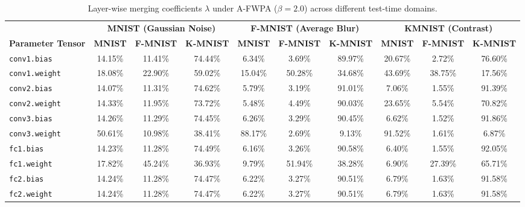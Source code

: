 \documentclass{article}
\theoremstyle{plain}
\theoremstyle{definition}
\theoremstyle{remark}
\begin{document}
\begin{table}[h]
\centering
\caption{Layer-wise merging coefficients $\lambda$ under A-FWPA ($\beta = 2.0$) across different test-time domains.}
\label{tab:layer_dynamics_specs}
\vskip 0.1in
\scriptsize
\setlength{\tabcolsep}{4pt}
\begin{tabular}{lccccccccc}
\toprule
 & \multicolumn{3}{c}{\textbf{MNIST (Gaussian Noise)}} & \multicolumn{3}{c}{\textbf{F-MNIST (Average Blur)}} & \multicolumn{3}{c}{\textbf{KMNIST (Contrast)}} \\
\cmidrule(r){2-4} \cmidrule(r){5-7} \cmidrule(r){8-10}
\textbf{Parameter Tensor} & \textbf{MNIST} & \textbf{F-MNIST} & \textbf{K-MNIST} & \textbf{MNIST} & \textbf{F-MNIST} & \textbf{K-MNIST} & \textbf{MNIST} & \textbf{F-MNIST} & \textbf{K-MNIST} \\
\midrule
\texttt{conv1.bias} & 14.15\% & 11.41\% & 74.44\% & 6.34\% & 3.69\% & 89.97\% & 20.67\% & 2.72\% & 76.60\% \\
\texttt{conv1.weight} & 18.08\% & 22.90\% & 59.02\% & 15.04\% & 50.28\% & 34.68\% & 43.69\% & 38.75\% & 17.56\% \\
\texttt{conv2.bias} & 14.07\% & 11.31\% & 74.62\% & 5.79\% & 3.19\% & 91.01\% & 7.06\% & 1.55\% & 91.39\% \\
\texttt{conv2.weight} & 14.33\% & 11.95\% & 73.72\% & 5.48\% & 4.49\% & 90.03\% & 23.65\% & 5.54\% & 70.82\% \\
\texttt{conv3.bias} & 14.26\% & 11.29\% & 74.45\% & 6.26\% & 3.29\% & 90.45\% & 6.62\% & 1.52\% & 91.86\% \\
\texttt{conv3.weight} & 50.61\% & 10.98\% & 38.41\% & 88.17\% & 2.69\% & 9.13\% & 91.52\% & 1.61\% & 6.87\% \\
\texttt{fc1.bias} & 14.23\% & 11.28\% & 74.49\% & 6.16\% & 3.26\% & 90.58\% & 6.40\% & 1.55\% & 92.05\% \\
\texttt{fc1.weight} & 17.82\% & 45.24\% & 36.93\% & 9.79\% & 51.94\% & 38.28\% & 6.90\% & 27.39\% & 65.71\% \\
\texttt{fc2.bias} & 14.24\% & 11.28\% & 74.47\% & 6.22\% & 3.27\% & 90.51\% & 6.79\% & 1.63\% & 91.58\% \\
\texttt{fc2.weight} & 14.24\% & 11.28\% & 74.47\% & 6.22\% & 3.27\% & 90.51\% & 6.79\% & 1.63\% & 91.58\% \\
\bottomrule
\end{tabular}
\end{table}
\end{document}
